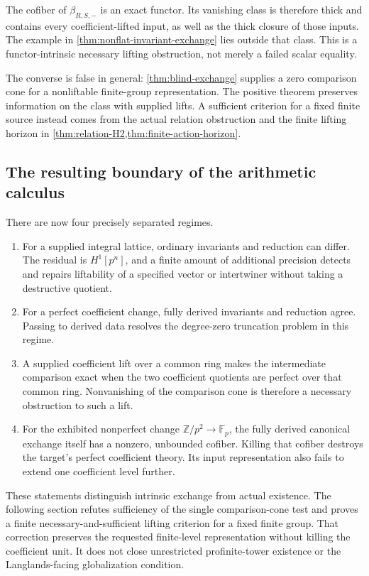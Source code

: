 \documentclass[11pt]{article}
\theoremstyle{definition}
\theoremstyle{remark}
\begin{document}
The cofiber of $\beta_{R,S,-}$ is an exact functor. Its vanishing class is therefore thick and contains every coefficient-lifted input, as well as the thick closure of those inputs. The example in \cref{thm:nonflat-invariant-exchange} lies outside that class. This is a functor-intrinsic necessary lifting obstruction, not merely a failed scalar equality.

The converse is false in general: \cref{thm:blind-exchange} supplies a zero comparison cone for a nonliftable finite-group representation. The positive theorem preserves information on the class with supplied lifts. A sufficient criterion for a fixed finite source instead comes from the actual relation obstruction and the finite lifting horizon in \cref{thm:relation-H2,thm:finite-action-horizon}.

\subsection{The resulting boundary of the arithmetic calculus}

There are now four precisely separated regimes.
\begin{enumerate}
\item For a supplied integral lattice, ordinary invariants and reduction can differ. The residual is $H^1[p^n]$, and a finite amount of additional precision detects and repairs liftability of a specified vector or intertwiner without taking a destructive quotient.
\item For a perfect coefficient change, fully derived invariants and reduction agree. Passing to derived data resolves the degree-zero truncation problem in this regime.
\item A supplied coefficient lift over a common ring makes the intermediate comparison exact when the two coefficient quotients are perfect over that common ring. Nonvanishing of the comparison cone is therefore a necessary obstruction to such a lift.
\item For the exhibited nonperfect change $\mathbb Z/p^2\to\mathbb F_p$, the fully derived canonical exchange itself has a nonzero, unbounded cofiber. Killing that cofiber destroys the target's perfect coefficient theory. Its input representation also fails to extend one coefficient level further.
\end{enumerate}
These statements distinguish intrinsic exchange from actual existence. The following section refutes sufficiency of the single comparison-cone test and proves a finite necessary-and-sufficient lifting criterion for a fixed finite group. That correction preserves the requested finite-level representation without killing the coefficient unit. It does not close unrestricted profinite-tower existence or the Langlands-facing globalization condition.
\end{document}
